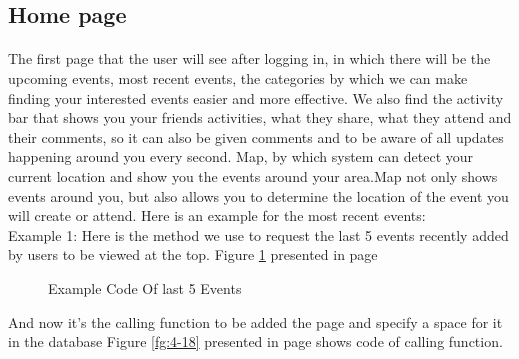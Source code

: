 \documentclass[12pt,a4paper,class,twoside,openany]{report}
\begin{document}
{\subsection{Home page}
\paragraph*{\hspace{.9 cm} } The first page that the user will see after logging in, in which there will be   the upcoming events, most recent events, the categories by which we can make finding your interested events easier and more effective. We also find the activity bar that shows you your friends activities, what they share, what they attend and their comments, so it can also be given comments and to be aware of all updates happening around you every second.
  Map, by which system can detect your current location and show you the events around your area.Map not only shows events around you, but also allows you to determine the location of the event you will create or attend.
Here is an example for the most recent events:
\\
Example 1:
Here is the method we use to request the last 5 events recently added by users to be viewed at the top.
Figure \ref{fg:4-17} presented in page \pageref{fg:4-17}
\begin{figure}
\begin{center}
\caption{Example Code Of last 5 Events}
\label{fg:4-17}
\end{center}
\end{figure}
And now it's the calling function to be added the page and specify a space for it in the database
Figure \ref{fg:4-18} presented in page \pageref{fg:4-18} shows code of calling function.
\begin{figure}
\begin{center}
\end{center}
\end{figure}}
\end{document}
